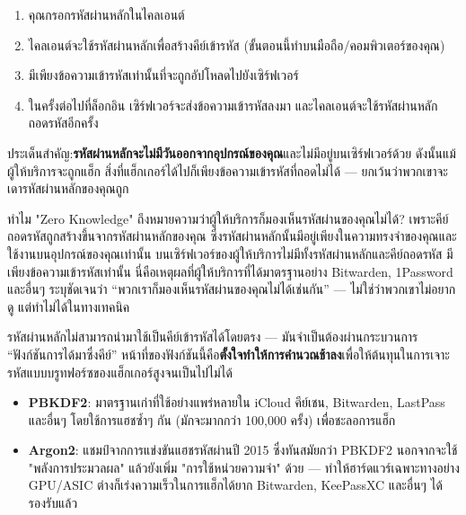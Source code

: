 \begin{enumerate}
  \item คุณกรอกรหัสผ่านหลักในไคลเอนต์
  \item ไคลเอนต์จะใช้รหัสผ่านหลักเพื่อสร้างคีย์เข้ารหัส (ขั้นตอนนี้ทำบนมือถือ/คอมพิวเตอร์ของคุณ)
  \item มีเพียงข้อความเข้ารหัสเท่านั้นที่จะถูกอัปโหลดไปยังเซิร์ฟเวอร์
  \item ในครั้งต่อไปที่ล็อกอิน เซิร์ฟเวอร์จะส่งข้อความเข้ารหัสลงมา และไคลเอนต์จะใช้รหัสผ่านหลักถอดรหัสอีกครั้ง
\end{enumerate}

ประเด็นสำคัญ:\textbf{รหัสผ่านหลักจะไม่มีวันออกจากอุปกรณ์ของคุณ}และไม่มีอยู่บนเซิร์ฟเวอร์ด้วย ดังนั้นแม้ผู้ให้บริการจะถูกแฮ็ก สิ่งที่แฮ็กเกอร์ได้ไปก็เพียงข้อความเข้ารหัสที่ถอดไม่ได้ — ยกเว้นว่าพวกเขาจะเดารหัสผ่านหลักของคุณถูก

\begin{tcbinfo}{ทำไม "Zero Knowledge" ถึงหมายความว่าผู้ให้บริการก็มองเห็นรหัสผ่านของคุณไม่ได้?}
เพราะคีย์ถอดรหัสถูกสร้างขึ้นจากรหัสผ่านหลักของคุณ ซึ่งรหัสผ่านหลักนั้นมีอยู่เพียงในความทรงจำของคุณและใช้งานบนอุปกรณ์ของคุณเท่านั้น บนเซิร์ฟเวอร์ของผู้ให้บริการไม่มีทั้งรหัสผ่านหลักและคีย์ถอดรหัส มีเพียงข้อความเข้ารหัสเท่านั้น นี่คือเหตุผลที่ผู้ให้บริการที่ได้มาตรฐานอย่าง Bitwarden, 1Password และอื่นๆ ระบุชัดเจนว่า “พวกเราก็มองเห็นรหัสผ่านของคุณไม่ได้เช่นกัน” — ไม่ใช่ว่าพวกเขาไม่อยากดู แต่ทำไม่ได้ในทางเทคนิค

\end{tcbinfo}


รหัสผ่านหลักไม่สามารถนำมาใช้เป็นคีย์เข้ารหัสได้โดยตรง — มันจำเป็นต้องผ่านกระบวนการ “ฟังก์ชันการได้มาซึ่งคีย์” หน้าที่ของฟังก์ชันนี้คือ\textbf{ตั้งใจทำให้การคำนวณช้าลง}เพื่อให้ต้นทุนในการเจาะรหัสแบบบรูทฟอร์ซของแฮ็กเกอร์สูงจนเป็นไปไม่ได้

\begin{itemize}
  \item \textbf{PBKDF2}: มาตรฐานเก่าที่ใช้อย่างแพร่หลายใน iCloud คีย์เชน, Bitwarden, LastPass และอื่นๆ โดยใช้การแฮชซ้ำๆ กัน (มักจะมากกว่า 100,000 ครั้ง) เพื่อชะลอการแฮ็ก
  \item \textbf{Argon2}: แชมป์จากการแข่งขันแฮชรหัสผ่านปี 2015 ซึ่งทันสมัยกว่า PBKDF2 นอกจากจะใช้ "พลังการประมวลผล" แล้วยังเพิ่ม "การใช้หน่วยความจำ" ด้วย — ทำให้ฮาร์ดแวร์เฉพาะทางอย่าง GPU/ASIC ต่างก็เร่งความเร็วในการแฮ็กได้ยาก Bitwarden, KeePassXC และอื่นๆ ได้รองรับแล้ว
\end{itemize}

